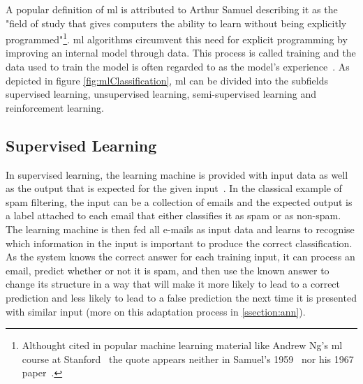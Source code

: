 \documentclass[
			   fontsize=11pt,
               paper=a4,
               bibliography=totoc,
               idxtotoc,
               headsepline,
               footsepline,
               footinclude=false,
               BCOR=12mm,
               DIV=13,
               openany,   %
               oneside    %
               ]
               {scrbook}
\begin{document}
A popular definition of \acrlong{ml} is attributed to Arthur Samuel describing it as the "field of study that gives computers the ability to learn without being explicitly programmed"\footnote{Althought cited in popular machine learning material like Andrew Ng's \gls{ml} course at Stanford~\cite{mlCourseStan} the quote appears neither in Samuel's 1959~\cite{mlQuote1959} nor his 1967 paper~\cite{mlQuote1967}.}. \acrlong{ml} algorithms circumvent this need for explicit programming by improving an internal model through data. This process is called training and the data used to train the model is often regarded to as the model's experience~\cite{mlMitchell}. As depicted in figure \autoref{fig:mlClassification}, \gls{ml} can be divided into the subfields supervised learning, unsupervised learning, semi-supervised learning and reinforcement learning.

\subsection{Supervised Learning}
In supervised learning, the learning machine is provided with input data as well as the output that is expected for the given input~\cite{introSupervised}. In the classical example of spam filtering, the input can be a collection of emails and the expected output is a label attached to each email that either classifies it as spam or as non-spam. The learning machine is then fed all e-mails as input data and learns to recognise which information in the input is important to produce the correct classification. As the system knows the correct answer for each training input, it can process an email, predict whether or not it is spam, and then use the known answer to change its structure in a way that will make it more likely to lead to a correct prediction and less likely to lead to a false prediction the next time it is presented with similar input (more on this adaptation process in \autoref{ssection:ann}).
\end{document}
